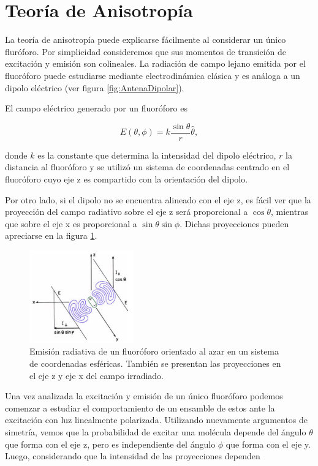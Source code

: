 \section{Teoría de Anisotropía}

La teoría de anisotropía puede explicarse fácilmente al considerar un único fluróforo. Por simplicidad consideremos que sus momentos de transición de excitación y emisión son colineales. La radiación de campo lejano emitida por el fluoróforo puede estudiarse mediante electrodinámica clásica y es análoga a un dipolo eléctrico (ver figura \ref{fig:AntenaDipolar}).

El campo eléctrico generado por un fluoróforo es

\begin{equation}
    E(\theta, \phi) = k \frac{\sin{ \theta}}{r} \hat{\theta},
\end{equation}

\noindent donde $k$ es la constante que determina la intensidad del dipolo eléctrico, $r$ la distancia al fluoróforo y se utilizó un sistema de coordenadas centrado en el fluoróforo cuyo eje z es compartido con la orientación del dipolo.

Por otro lado, si el dipolo no se encuentra alineado con el eje z, es fácil ver que la proyección del campo radiativo sobre el eje z será proporcional a $\cos{ \theta}$, mientras que sobre el eje x es proporcional a $\sin {\theta} \sin {\phi}$. Dichas proyecciones pueden apreciarse en la figura \ref{fig:RadiacionFluoroforo}.

\begin{figure}
    \centering
    \includegraphics[width=0.4\textwidth]{./img/RadiacionFluoroforo.png}
    \caption{Emisión radiativa de un fluoróforo orientado al azar en un sistema de coordenadas esféricas. También se presentan las proyecciones en el eje z y eje x del campo irradiado\cite{Lakowicz2006}.}
    \label{fig:RadiacionFluoroforo}
\end{figure}

Una vez analizada la excitación y emisión de un único fluoróforo podemos comenzar a estudiar el comportamiento de un ensamble de estos ante la excitación con luz linealmente polarizada. Utilizando nuevamente argumentos de simetría, vemos que la probabilidad de excitar una molécula depende del ángulo $\theta$ que forma con el eje z, pero es independiente del ángulo $\phi$ que forma con el eje y. Luego, considerando que la intensidad de las proyecciones dependen

